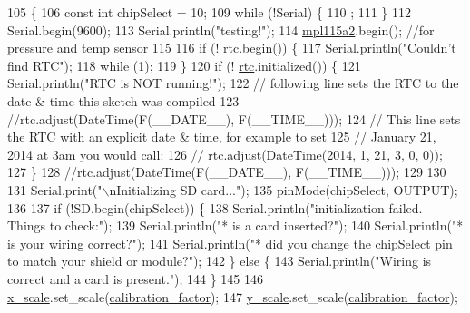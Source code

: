 \begin{DoxyCode}
105 \{
106     \textcolor{keyword}{const} \textcolor{keywordtype}{int} chipSelect = 10; 
109     \textcolor{keywordflow}{while} (!Serial) \{
110         ; 
111     \}
112     Serial.begin(9600);
113     Serial.println(\textcolor{stringliteral}{"testing!"});
114     \mbox{\hyperlink{windsensor_8ino_ad968397c6ea6b9db90c2cab353353f5a}{mpl115a2}}.begin(); \textcolor{comment}{//for pressure and temp sensor}
115     
116     \textcolor{keywordflow}{if} (! \mbox{\hyperlink{windsensor_8ino_adab40bd3cc2c36728a2a34e813a75b88}{rtc}}.begin()) \{
117         Serial.println(\textcolor{stringliteral}{"Couldn't find RTC"});
118         \textcolor{keywordflow}{while} (1);
119     \}
120     \textcolor{keywordflow}{if} (! \mbox{\hyperlink{windsensor_8ino_adab40bd3cc2c36728a2a34e813a75b88}{rtc}}.initialized()) \{
121         Serial.println(\textcolor{stringliteral}{"RTC is NOT running!"});
122         \textcolor{comment}{// following line sets the RTC to the date & time this sketch was compiled}
123         \textcolor{comment}{//rtc.adjust(DateTime(F(\_\_DATE\_\_), F(\_\_TIME\_\_)));}
124         \textcolor{comment}{// This line sets the RTC with an explicit date & time, for example to set}
125         \textcolor{comment}{// January 21, 2014 at 3am you would call:}
126         \textcolor{comment}{// rtc.adjust(DateTime(2014, 1, 21, 3, 0, 0));}
127     \}
128     \textcolor{comment}{//rtc.adjust(DateTime(F(\_\_DATE\_\_), F(\_\_TIME\_\_)));}
129 
130 
131     Serial.print(\textcolor{stringliteral}{"\(\backslash\)nInitializing SD card..."});
135     pinMode(chipSelect, OUTPUT); 
136    
137     \textcolor{keywordflow}{if} (!SD.begin(chipSelect)) \{
138         Serial.println(\textcolor{stringliteral}{"initialization failed. Things to check:"});
139         Serial.println(\textcolor{stringliteral}{"* is a card inserted?"});
140         Serial.println(\textcolor{stringliteral}{"* is your wiring correct?"});
141         Serial.println(\textcolor{stringliteral}{"* did you change the chipSelect pin to match your shield or module?"});
142     \} \textcolor{keywordflow}{else} \{
143         Serial.println(\textcolor{stringliteral}{"Wiring is correct and a card is present."});
144     \}
145 
146     \mbox{\hyperlink{windsensor_8ino_a63487c630a07521a6eb55b8f607c193f}{x\_scale}}.set\_scale(\mbox{\hyperlink{windsensor_8ino_adb3564163b909516cbda0c168dbba86a}{calibration\_factor}});
147     \mbox{\hyperlink{windsensor_8ino_aff383f74e82e01501521b84d1bc001e2}{y\_scale}}.set\_scale(\mbox{\hyperlink{windsensor_8ino_adb3564163b909516cbda0c168dbba86a}{calibration\_factor}});

\end{DoxyCode}
